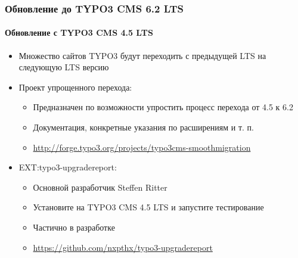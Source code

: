 
\begin{frame}[fragile]
	\frametitle{Обновление до TYPO3 CMS 6.2 LTS}
	\framesubtitle{Обновление с TYPO3 CMS 4.5 LTS}

	\begin{itemize}
		\item Множество сайтов TYPO3 будут переходить с предыдущей LTS на следующую LTS версию
		\item Проект упрощенного перехода:

			\begin{itemize}
				\item Предназначен по возможности упростить процесс перехода от 4.5 к 6.2
				\item Документация, конкретные указания по расширениям и т. п.
				\item \smaller\url{http://forge.typo3.org/projects/typo3cms-smoothmigration}\normalsize
			\end{itemize}

		\item EXT:typo3-upgradereport:

			\begin{itemize}
				\item Основной разработчик Steffen Ritter
				\item Установите на TYPO3 CMS 4.5 LTS и запустите тестирование
				\item Частично в разработке
				\item \smaller\url{https://github.com/nxpthx/typo3-upgradereport}\normalsize
			\end{itemize}
	\end{itemize}

\end{frame}


